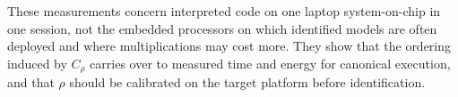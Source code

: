 These measurements concern interpreted code on one laptop system-on-chip in one session, not the embedded processors
on which identified models are often deployed and where multiplications may cost more. They show that the ordering
induced by $C_\rho$ carries over to measured time and energy for canonical execution, and that $\rho$ should be
calibrated on the target platform before identification.

\FloatBarrier
